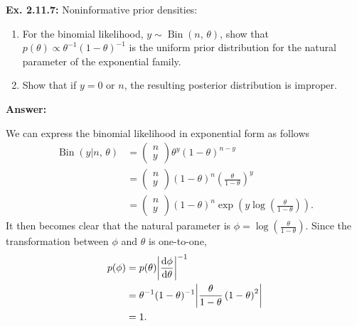 \documentclass{article}
\newcommand\oname\operatorname
\begin{document}
\textbf{Ex. 2.11.7: }Noninformative prior densities:
\begin{enumerate}[label=\alph*]
	\item For the binomial likelihood, $y\sim\oname{Bin}(n,\,\theta)$, show that $p(\theta)\propto\theta^{-1}(1-\theta)^{-1}$ is the uniform prior distribution for the natural parameter of the exponential family.
	\item Show that if $y=0$ or $n$, the resulting posterior distribution is improper.
\end{enumerate}

\textbf{Answer:}

We can express the binomial likelihood in exponential form as follows
\begin{align*}
	\oname{Bin}(y|n,\,\theta)&=\begin{pmatrix}n\\y\end{pmatrix}\theta^y(1-\theta)^{n-y}\\
	&=\begin{pmatrix}n\\y\end{pmatrix}(1-\theta)^n\left(\frac\theta{1-\theta}\right)^y\\
	&=\begin{pmatrix}n\\y\end{pmatrix}(1-\theta)^n\exp\left(y\log\left(\frac\theta{1-\theta}\right)\right).
\end{align*}
It then becomes clear that the natural parameter is $\phi=\log\left(\frac\theta{1-\theta}\right)$. Since the transformation between $\phi$ and $\theta$ is one-to-one,
\begin{align*}
	p(\phi)&=p(\theta)\abs{\frac{\mathrm d\phi}{\mathrm d\theta}}^{-1}\\
	&=\theta^{-1}(1-\theta)^{-1}\abs{\frac{\theta}{1-\theta}\left(1-\theta\right)^2}\\
	&=1.
\end{align*}
\end{document}
